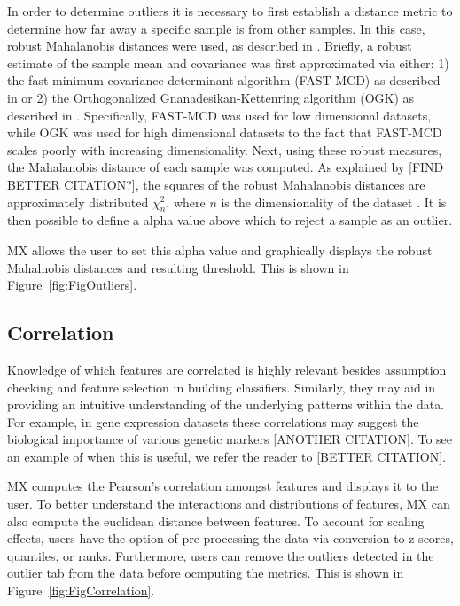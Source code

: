 \documentclass[12pt]{article}
\begin{document}
In order to determine outliers it is necessary to first establish a distance metric to determine how far away a specific sample is from other samples. In this case, robust Mahalanobis distances were used, as described in \cite{hubert2008high}. Briefly, a robust estimate of the sample mean and covariance was first approximated via either: 1) the fast minimum covariance determinant algorithm (FAST-MCD) as described in \cite{rousseeuw1999fast} or 2) the Orthogonalized Gnanadesikan-Kettenring algorithm (OGK) as described in \cite{maronna2002robust}. Specifically, FAST-MCD was used for low dimensional datasets, while OGK was used for high dimensional datasets to the fact that FAST-MCD scales poorly with increasing dimensionality. Next, using these robust measures, the Mahalanobis distance of each sample was computed. As explained by \cite{hardin2012distribution} [FIND BETTER CITATION?], the squares of the robust Mahalanobis distances are approximately distributed $\chi^2_n$, where $n$ is the dimensionality of the dataset . It is then possible to define a alpha value above which to reject a sample as an outlier. 

MX allows the user to set this alpha value and graphically displays the robust Mahalnobis distances and resulting threshold. This is shown in Figure~\ref{fig:FigOutliers}.

\subsection{Correlation}
\label{subsec:SubSecCorrelation}

Knowledge of which features are correlated is highly relevant besides assumption checking and feature selection in building classifiers. Similarly, they may aid in providing an intuitive understanding of the underlying patterns within the data. For example, in gene expression datasets these correlations may suggest the biological importance of various genetic markers [ANOTHER CITATION]. To see an example of when this is useful, we refer the reader to \cite{shi2012unsupervised} [BETTER CITATION].

MX computes the Pearson's correlation amongst features and displays it to the user. To better understand the interactions and distributions of features, MX can also compute the euclidean distance between features. To account for scaling effects, users have the option of pre-processing the data via conversion to z-scores, quantiles, or ranks. Furthermore, users can remove the outliers detected in the outlier tab from the data before ocmputing the metrics. This is shown in Figure~\ref{fig:FigCorrelation}.
\end{document}
